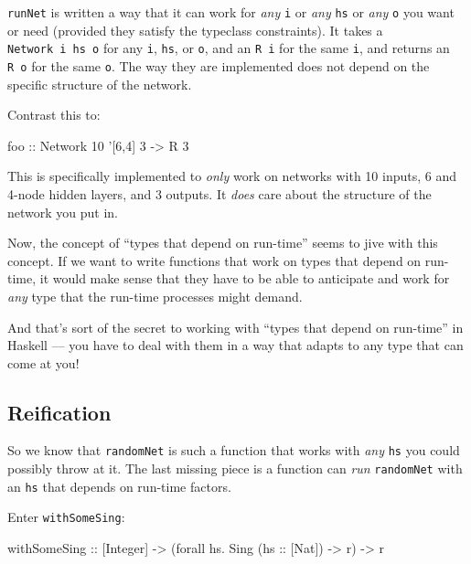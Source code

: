 \documentclass[]{article}
\newenvironment{Shaded}{}{}
\newcommand{\DataTypeTok}[1]{\textcolor[rgb]{0.56,0.13,0.00}{{#1}}}
\newcommand{\DecValTok}[1]{\textcolor[rgb]{0.25,0.63,0.44}{{#1}}}
\newcommand{\CharTok}[1]{\textcolor[rgb]{0.25,0.44,0.63}{{#1}}}
\newcommand{\OtherTok}[1]{\textcolor[rgb]{0.00,0.44,0.13}{{#1}}}
\newcommand{\FunctionTok}[1]{\textcolor[rgb]{0.02,0.16,0.49}{{#1}}}
\newcommand{\NormalTok}[1]{{#1}}
\begin{document}
\texttt{runNet} is written a way that it can work for \emph{any} \texttt{i} or
\emph{any} \texttt{hs} or \emph{any} \texttt{o} you want or need (provided they
satisfy the typeclass constraints). It takes a \texttt{Network\ i\ hs\ o} for
any \texttt{i}, \texttt{hs}, or \texttt{o}, and an \texttt{R\ i} for the same
\texttt{i}, and returns an \texttt{R\ o} for the same \texttt{o}. The way they
are implemented does not depend on the specific structure of the network.

Contrast this to:

\begin{Shaded}
\begin{Highlighting}[]
\OtherTok{foo ::} \DataTypeTok{Network} \DecValTok{10} \CharTok{'[6,4] 3 -> R 3}
\end{Highlighting}
\end{Shaded}

This is specifically implemented to \emph{only} work on networks with 10 inputs,
6 and 4-node hidden layers, and 3 outputs. It \emph{does} care about the
structure of the network you put in.

Now, the concept of ``types that depend on run-time'' seems to jive with this
concept. If we want to write functions that work on types that depend on
run-time, it would make sense that they have to be able to anticipate and work
for \emph{any} type that the run-time processes might demand.

And that's sort of the secret to working with ``types that depend on run-time''
in Haskell --- you have to deal with them in a way that adapts to any type that
can come at you!

\subsection{Reification}\label{reification}

So we know that \texttt{randomNet} is such a function that works with \emph{any}
\texttt{hs} you could possibly throw at it. The last missing piece is a function
can \emph{run} \texttt{randomNet} with an \texttt{hs} that depends on run-time
factors.

Enter \texttt{withSomeSing}:

\begin{Shaded}
\begin{Highlighting}[]
\NormalTok{withSomeSing}
\OtherTok{    ::} \NormalTok{[}\DataTypeTok{Integer}\NormalTok{]}
    \OtherTok{->} \NormalTok{(forall hs}\FunctionTok{.} \DataTypeTok{Sing} \NormalTok{(}\OtherTok{hs ::} \NormalTok{[}\DataTypeTok{Nat}\NormalTok{]) }\OtherTok{->} \NormalTok{r)}
    \OtherTok{->} \NormalTok{r}
\end{Highlighting}
\end{Shaded}
\end{document}
